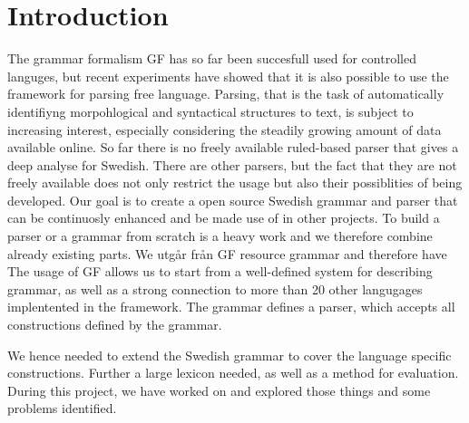 \documentclass{report}
\begin{document}
\chapter{Introduction}
The grammar formalism GF has so far been succesfull used for 
controlled languges, but recent experiments have showed
that it is also possible to use the framework for parsing free language.
Parsing, that is the task of automatically identifiyng morpohlogical and
syntactical structures to text, is subject to increasing interest, especially
considering the steadily growing amount of data available online. 
So far there is no freely available ruled-based parser that gives a deep analyse for
Swedish.  There are other parsers, but the fact that they are not freely available does not only
restrict the usage but also their possiblities of being developed. Our goal is
to create a open source Swedish grammar and parser that can be continuosly enhanced and
be made use of in other projects.
To build a parser or a grammar from scratch is a heavy work and we
therefore combine already existing parts.
We utgår från GF resource grammar and therefore have 
The usage of GF allows us to start from
a well-defined system for describing grammar, as well as a strong connection to
more than 20 other langugages implentented in the framework.
The grammar defines a parser, which accepts all constructions defined by the grammar.

We hence needed to extend the Swedish grammar to cover
the language specific constructions. Further a large lexicon needed, as well
as a method for evaluation.
During this project, we have worked on and explored those things and some problems identified.


\end{document}
